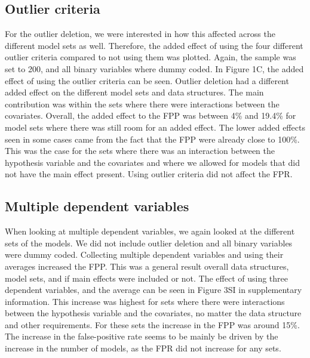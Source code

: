 \subsection{Outlier criteria}
For the outlier deletion, we were interested in how this affected across the different model sets as well. Therefore, the added effect of using the four different outlier criteria compared to not using them was plotted. Again, the sample was set to 200, and all binary variables where dummy coded. In Figure 1C, the added effect of using the outlier criteria can be seen. Outlier deletion had a different added effect on the different model sets and data structures. The main contribution was within the sets where there were interactions between the covariates. Overall, the added effect to the FPP was between 4\% and 19.4\% for model sets where there was still room for an added effect. The lower added effects seen in some cases came from the fact that the FPP were already close to 100\%. This was the case for the sets where there was an interaction between the hypothesis variable and the covariates and where we allowed for models that did not have the main effect present. Using outlier criteria did not affect the FPR. 

\subsection{Multiple dependent variables}
When looking at multiple dependent variables, we again looked at the different sets of the models. We did not include outlier deletion and all binary variables were dummy coded. Collecting multiple dependent variables and using their averages increased the FPP. This was a general result overall data structures, model sets, and if main effects were included or not. The effect of using three dependent variables, and the average can be seen in Figure 3SI in supplementary information. This increase was highest for sets where there were interactions between the hypothesis variable and the covariates, no matter the data structure and other requirements. For these sets the increase in the FPP was around 15\%. The increase in the false-positive rate seems to be mainly be driven by the increase in the number of models, as the FPR did not increase for any sets. 

